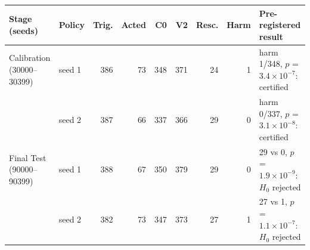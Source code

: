 \begin{tabular}{llrrrrrrl}
\toprule
Stage (seeds) & Policy & Trig. & Acted & C0 & V2 & Resc. & Harm & Pre-registered result\\
\midrule
Calibration (30000--30399) & seed 1 & 386 & 73 & 348 & 371 & 24 & 1 & harm 1/348, $p$ = $3.4\times10^{-7}$: certified\\
 & seed 2 & 387 & 66 & 337 & 366 & 29 & 0 & harm 0/337, $p$ = $3.1\times10^{-8}$: certified\\
\midrule
Final Test (90000--90399) & seed 1 & 388 & 67 & 350 & 379 & 29 & 0 & 29 vs 0, $p$ = $1.9\times10^{-9}$: $H_0$ rejected\\
 & seed 2 & 382 & 73 & 347 & 373 & 27 & 1 & 27 vs 1, $p$ = $1.1\times10^{-7}$: $H_0$ rejected\\
\bottomrule
\end{tabular}
